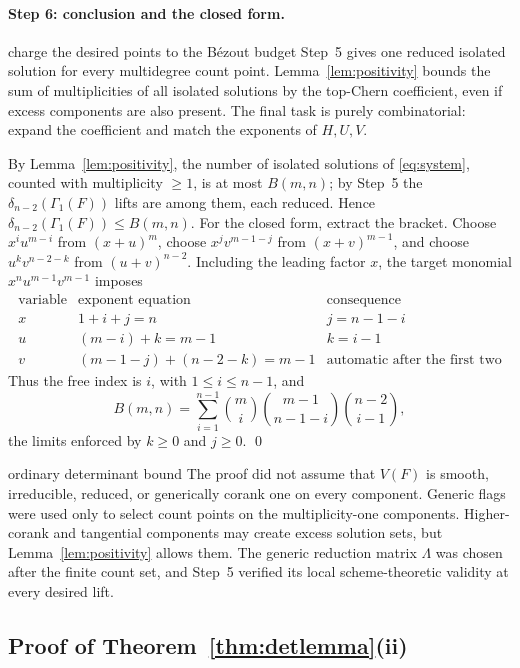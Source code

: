 \documentclass[acmsmall,screen,nonacm]{acmart}
\theoremstyle{definition}
\theoremstyle{remark}
\newcommand{\pdeg}{\delta}
\newcommand{\Gone}{\Gamma_{\!1}}
\begin{document}
\paragraph{Step 6: conclusion and the closed form.}
\begin{roadmapbox}{charge the desired points to the B\'ezout budget}
Step~5 gives one reduced isolated solution for every multidegree count point.
Lemma~\ref{lem:positivity} bounds the sum of multiplicities of all isolated
solutions by the top-Chern coefficient, even if excess components are also
present.  The final task is purely combinatorial: expand the coefficient and
match the exponents of $H,U,V$.
\end{roadmapbox}
By Lemma~\ref{lem:positivity}, the number of isolated solutions of
\eqref{eq:system}, counted with multiplicity $\ge1$, is at most
$B(m,n)$; by Step~5 the $\pdeg_{n-2}(\Gone(F))$ lifts are among them,
each reduced.  Hence $\pdeg_{n-2}(\Gone(F))\le B(m,n)$.  For the
closed form, extract the bracket.  Choose $x^i u^{m-i}$ from
$(x+u)^m$, choose $x^j v^{m-1-j}$ from $(x+v)^{m-1}$, and choose
$u^k v^{n-2-k}$ from $(u+v)^{n-2}$.  Including the leading factor
$x$, the target monomial $x^nu^{m-1}v^{m-1}$ imposes
\[
\begin{array}{c|c|c}
\text{variable} & \text{exponent equation} & \text{consequence}\\ \hline
x & 1+i+j=n & j=n-1-i\\
u & (m-i)+k=m-1 & k=i-1\\
v & (m-1-j)+(n-2-k)=m-1 & \text{automatic after the first two}
\end{array}
\]
Thus the free index is $i$, with $1\le i\le n-1$, and
\[
  B(m,n)=\sum_{i=1}^{n-1}\binom{m}{i}\binom{m-1}{n-1-i}
  \binom{n-2}{i-1},
\]
the limits enforced by $k\ge0$ and $j\ge0$.
\qed

\begin{checklistbox}{ordinary determinant bound}
The proof did not assume that $V(F)$ is smooth, irreducible, reduced, or
generically corank one on every component.  Generic flags were used only to
select count points on the multiplicity-one components.  Higher-corank and
tangential components may create excess solution sets, but
Lemma~\ref{lem:positivity} allows them.  The generic reduction matrix
$\Lambda$ was chosen after the finite count set, and Step~5 verified its local
scheme-theoretic validity at every desired lift.
\end{checklistbox}

\subsection{Proof of Theorem~\ref{thm:detlemma}(ii)}
\label{subsec:symproof}
\end{document}

